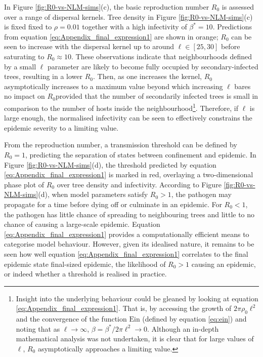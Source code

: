 In Figure \ref{fig:R0-vs-NLM-sims}(c), the basic reproduction number $R_0$ is assessed over a range of dispersal kernels.
Tree density in Figure \ref{fig:R0-vs-NLM-sims}(c) is fixed fixed to $\rho=0.01$ together with a high infectivity of $\beta^*=10$.
Predictions from equation \ref{eq:Appendix_final_expression1} are shown in orange;
$R_0$ can be seen to increase with the dispersal kernel up to around $\ell \in [25, 30]$ before saturating to $R_0 \approx 10$. 
These observations indicate that neighbourhoods defined by a small $\ell$ parameter are likely to become fully occupied by secondary-infected trees, resulting in a lower $R_0$.
Then, as one increases the kernel, $R_0$ asymptotically increases to a maximum value beyond which increasing $\ell$ bares no impact on $R_0$\textemdash provided that the number of secondarily infected trees is small in comparison to the number of hosts inside the neighbourhood\footnote{Insight into the underlying behaviour could be gleaned by looking at equation \ref{eq:Appendix_final_expression1}. That is, by accessing the growth of $2\pi \rho_0 \ell^2$ and the convergence of the function $\mathrm{Ein}$ (defined by equation \ref{eq:ein}) and noting that as $\ell \rightarrow \infty$, $\beta=\beta^*/2\pi\ell^2 \rightarrow 0$. Although an in-depth mathematical analysis was not undertaken, it is clear that for large values of $\ell$, $R_0$ asymptotically approaches a limiting value.}.
Therefore, if $\ell$ is large enough, the normalised infectivity can be seen to effectively constrains the epidemic severity to a limiting value.

From the reproduction number, a transmission threshold can be defined by $R_0=1$,  predicting the separation of states between confinement and epidemic.
In Figure \ref{fig:R0-vs-NLM-sims}(d), the threshold predicted by equation \ref{eq:Appendix_final_expression1} is marked in red, overlaying a two-dimensional phase plot of $R_0$ over tree density and infectivity.
According to Figure \ref{fig:R0-vs-NLM-sims}(d), when model parameters satisfy $R_0>1$, the pathogen may propagate for a time before dying off or culminate in an epidemic.
For $R_0<1$, the pathogen has little chance of spreading to neighbouring trees and little to no chance of causing a large-scale epidemic.
Equation \ref{eq:Appendix_final_expression1} provides a computationally efficient means to categorise model behaviour.
However, given its idealised nature, it remains to be seen how well equation \ref{eq:Appendix_final_expression1} correlates to the final epidemic state final-sized epidemic, the likelihood of $R_0>1$ causing an epidemic, or indeed whether a threshold is realised in practice.
